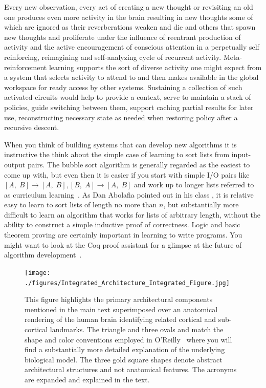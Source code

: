 Every new observation, every act of creating a new thought or revisiting an old one produces even more activity in the brain resulting in new thoughts some of which are ignored as their reverberations weaken and die and others that spawn new thoughts and proliferate under the influence of reentrant production of activity and the active encouragement of conscious attention in a perpetually self reinforcing, reimagining and self-analyzing cycle of recurrent activity. Meta-reinforcement learning supports the sort of diverse activity one might expect from a system that selects activity to attend to and then makes available in the global workspace for ready access by other systems. Sustaining a collection of such activated circuits would help to provide a context, serve to maintain a stack of policies, guide switching between them, support caching partial results for later use, reconstructing necessary state as needed when restoring policy after a recursive descent.

When you think of building systems that can develop new algorithms it is instructive the think about the simple case of learning to sort lists from input-output pairs. The bubble sort algorithm is generally regarded as the easiest to come up with, but even then it is easier if you start with simple I/O pairs like $[A,\;B] \rightarrow{} [A,\;B], [B,\;A] \rightarrow{} [A,\;B]$ and work up to longer lists \emdash{} referred to as curriculum learning~\cite{BengioetalICML-09}. As Dan Abolafia pointed out in his class {}, it is relative easy to learn to sort lists of length no more than $n$, but substantially more difficult to learn an algorithm that works for lists of arbitrary length, without the ability to construct a simple inductive proof of correctness. Logic and basic theorem proving are certainly important in learning to write programs. You might want to look at the Coq proof assistant for a glimpse at the future of algorithm development~\cite{BertotandCasteranCOQ-04}.


\begin{figure}
%
  \begin{center}
    \texttt{[image: ./figures/Integrated\_Architecture\_Integrated\_Figure.jpg]}
  \end{center}
%
  \caption{This figure highlights the primary architectural components mentioned in the main text superimposed over an anatomical rendering of the human brain identifying related cortical and sub-cortical landmarks. The triangle and three ovals and match the shape and color conventions employed in O'Reilly~\cite{OReillySCIENCE-06} where you will find a substantially more detailed explanation of the underlying biological model. The three gold square shapes denote abstract architectural structures and not anatomical features. The acronyms are expanded and explained in the text.}
%
  \label{fig_Integrated_Architecture_Integrated_Figure}
%
\end{figure}

